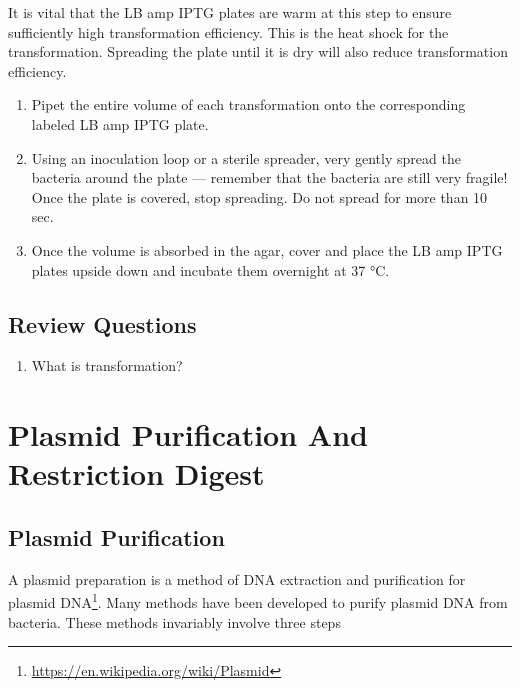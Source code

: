 \documentclass[]{book}
\providecommand{\tightlist}{%
  \setlength{\itemsep}{0pt}\setlength{\parskip}{0pt}}
\let\rmarkdownfootnote\footnote%
\def\footnote{\protect\rmarkdownfootnote}
\renewcommand{\href}[2]{#2\footnote{\url{#1}}}
\let\BeginKnitrBlock\begin \let\EndKnitrBlock\end
\begin{document}
\BeginKnitrBlock{rmdimportant}
It is vital that the LB amp IPTG plates are warm at this step to ensure sufficiently high transformation efficiency. This is the heat shock for the transformation. Spreading the plate until it is dry will also reduce transformation efficiency.
\EndKnitrBlock{rmdimportant}

\begin{enumerate}
\def\labelenumi{\arabic{enumi}.}
\setcounter{enumi}{21}
\tightlist
\item
  Pipet the entire volume of each transformation onto the corresponding labeled LB amp IPTG plate.
\item
  Using an inoculation loop or a sterile spreader, very gently spread the bacteria around the plate --- remember that the bacteria are still very fragile! Once the plate is covered, stop spreading. Do not spread for more than 10 sec.
\item
  Once the volume is absorbed in the agar, cover and place the LB amp IPTG plates upside down and incubate them overnight at 37 °C.
\end{enumerate}

\hypertarget{review-questions-8}{%
\section{Review Questions}\label{review-questions-8}}

\begin{enumerate}
\def\labelenumi{\arabic{enumi}.}
\tightlist
\item
  What is transformation?
\end{enumerate}

\hypertarget{plasmid-purification-and-restriction-digest}{%
\chapter{Plasmid Purification And Restriction Digest}\label{plasmid-purification-and-restriction-digest}}

\hypertarget{plasmid-purification}{%
\section{Plasmid Purification}\label{plasmid-purification}}

A plasmid preparation is a method of DNA extraction and purification for \href{https://en.wikipedia.org/wiki/Plasmid}{plasmid DNA}. Many methods have been developed to purify plasmid DNA from bacteria. These methods invariably involve three steps
\end{document}
